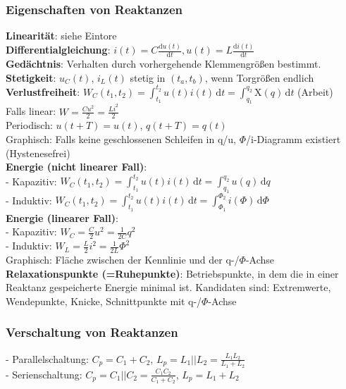 \documentclass[fs, footer]{latex4ei}
\begin{document}
\begin{multicols*}{4}
		\subsubsection{Eigenschaften von Reaktanzen}
		\textbf{Linearität}: siehe Eintore\\
		\textbf{Differentialgleichung}: $i(t) = C \frac{\mathrm du(t)}{\mathrm dt}, u(t) = L \frac{\mathrm di(t)}{\mathrm dt}$\\
		\textbf{Gedächtnis}: Verhalten durch vorhergehende Klemmengrößen bestimmt.\\
		\textbf{Stetigkeit}: $u_C(t)$, $i_L(t)$ stetig in $(t_a, t_b)$, wenn Torgrößen endlich\\
		\textbf{Verlustfreiheit}: $W_C(t_1, t_2) = \int_{t_1}^{t_2}\! u(t)i(t)\,\mathrm dt = \int_{q_1}^{q_2}\! \mathrm{X}(q)\,\mathrm{d}t$ (Arbeit)\\
		Falls linear: $W = \frac{Cu^2}{2} = \frac{Li^2}{2}$\\
		Periodisch: $u(t+T) = u(t)$, $q(t+T) = q(t)$\\
		Graphisch: Falls keine geschlossenen Schleifen in q/u, $\Phi$/i-Diagramm existiert (Hystenesefrei)\\
		\textbf{Energie (nicht linearer Fall)}:\\
		- Kapazitiv: $W_C(t_1, t_2) = \int_{t_1}^{t_2} \! u(t)i(t)\, \mathrm dt = \int_{q_1}^{q_2} \! u(q)\, \mathrm dq$\\
		- Induktiv: $W_C(t_1, t_2) = \int_{t_1}^{t_2} \! u(t)i(t)\, \mathrm dt = \int_{\Phi_1}^{\Phi_2} \! i(\Phi)\, \mathrm d\Phi$\\
		\textbf{Energie (linearer Fall)}:\\
		- Kapazitiv: $W_C = \frac{C}{2}u^2 = \frac{1}{2C}q^2$\\
		- Induktiv: $W_L = \frac{L}{2}i^2 = \frac{1}{2L} \Phi^2$\\
		Graphisch: Fläche zwischen der Kennlinie und der q-/$\Phi$-Achse\\
		\textbf{Relaxationspunkte (=Ruhepunkte)}: Betriebspunkte, in dem die in einer Reaktanz gespeicherte Energie minimal ist. Kandidaten sind: Extremwerte, Wendepunkte, Knicke, Schnittpunkte mit q-/$\Phi$-Achse\\
		\subsubsection{Verschaltung von Reaktanzen}
		- Parallelschaltung: $C_p = C_1 + C_2$, $L_p = L_1 || L_2 = \frac{L_1L_2}{L_1+L_2}$\\
		- Serienschaltung: $C_p = C_1 || C_2 = \frac{C_1C_2}{C_1+C_2}$, $L_p = L_1 + L_2$\\



\end{multicols*}
\end{document}
